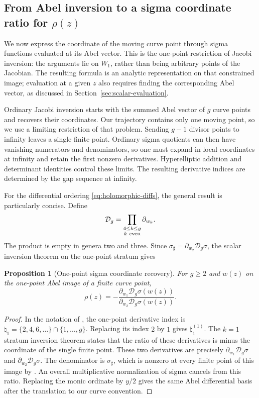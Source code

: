 \documentclass[11pt]{article}
\newtheorem{proposition}[theorem]{Proposition}
\begin{document}
\subsection{From Abel inversion to a sigma coordinate ratio for \texorpdfstring{$\rho(z)$}{rho(z)}}

We now express the coordinate of the moving curve point through sigma functions evaluated at its Abel vector. This is the one-point restriction of Jacobi inversion: the arguments lie on $W_1$, rather than being arbitrary points of the Jacobian. The resulting formula is an analytic representation on that constrained image; evaluation at a given $z$ also requires finding the corresponding Abel vector, as discussed in Section~\ref{sec:scalar-evaluation}.

Ordinary Jacobi inversion starts with the summed Abel vector of $g$ curve points and recovers their coordinates. Our trajectory contains only one moving point, so we use a limiting restriction of that problem. Sending $g-1$ divisor points to infinity leaves a single finite point. Ordinary sigma quotients can then have vanishing numerators and denominators, so one must expand in local coordinates at infinity and retain the first nonzero derivatives. Hyperelliptic addition and determinant identities control these limits. The resulting derivative indices are determined by the gap sequence at infinity.

For the differential ordering \eqref{eq:holomorphic-diffs}, the general result is particularly concise. Define
\begin{equation}\label{eq:inversion-operator}
\mathcal D_g=\prod_{\substack{4\le k\le g\\k\ {\rm even}}}\partial_{w_k}.
\end{equation}
The product is empty in genera two and three. Since $\sigma_\sharp=\partial_{w_2}\mathcal D_g\sigma$, the scalar inversion theorem on the one-point stratum gives
\begin{proposition}[One-point sigma coordinate recovery]\label{prop:inversion}
For $g\ge2$ and $w(z)$ on the one-point Abel image of a finite curve point,
\begin{equation}\label{eq:inversion-general}
\rho(z)=-\frac{\partial_{w_1}\mathcal D_g\sigma(w(z))}
{\partial_{w_2}\mathcal D_g\sigma(w(z))}.
\end{equation}
\end{proposition}
\begin{proof}
In the notation of \cite[Definition~5.1 and Theorem~5.5]{primeform}, the one-point derivative index is $\natural_1=\{2,4,6,\ldots\}\cap\{1,\ldots,g\}$. Replacing its index $2$ by $1$ gives $\natural_1^{(1)}$. The $k=1$ stratum inversion theorem states that the ratio of these derivatives is minus the coordinate of the single finite point. These two derivatives are precisely $\partial_{w_1}\mathcal D_g\sigma$ and $\partial_{w_2}\mathcal D_g\sigma$. The denominator is $\sigma_\sharp$, which is nonzero at every finite point of this image by \cite[Proposition~6.6(1)]{onishi}. An overall multiplicative normalization of sigma cancels from this ratio. Replacing the monic ordinate by $y/2$ gives the same Abel differential basis after the translation to our curve convention.
\end{proof}
\end{document}
